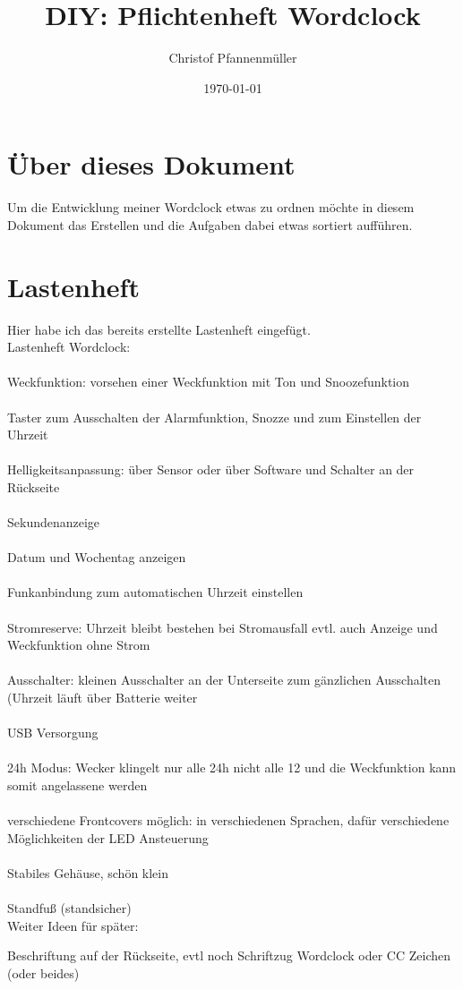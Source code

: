 \documentclass[11pt,a4paper,ngerman]{article}
\date{\today}
\author{Christof Pfannenmüller}
\title{DIY: Pflichtenheft Wordclock}
\begin{document}
\maketitle 
\tableofcontents 
\newpage
\section{Über dieses Dokument}
Um die Entwicklung meiner Wordclock etwas zu ordnen möchte in diesem Dokument das Erstellen und die Aufgaben dabei etwas sortiert aufführen.
\section{Lastenheft}
{\large Hier habe ich das bereits erstellte Lastenheft eingefügt.  }\\
Lastenheft Wordclock:\\
\\ 
Weckfunktion: vorsehen einer Weckfunktion mit Ton und Snoozefunktion\\
\\
Taster zum Ausschalten der Alarmfunktion, Snozze und zum Einstellen der Uhrzeit\\
\\
Helligkeitsanpassung: über Sensor oder über Software und Schalter an der Rückseite\\
\\
Sekundenanzeige\\
\\
Datum und Wochentag anzeigen\\ 
\\
Funkanbindung zum automatischen Uhrzeit einstellen\\
\\
Stromreserve: Uhrzeit bleibt bestehen bei Stromausfall  evtl. auch Anzeige und Weckfunktion ohne Strom\\ 
\\
Ausschalter: kleinen Ausschalter an der Unterseite zum gänzlichen Ausschalten (Uhrzeit läuft über Batterie weiter\\
\\
USB Versorgung\\
\\
24h Modus: Wecker klingelt nur alle 24h nicht alle 12 und die Weckfunktion kann somit angelassene werden\\
\\
verschiedene Frontcovers möglich: in verschiedenen Sprachen, dafür verschiedene Möglichkeiten der LED Ansteuerung\\
\\
Stabiles Gehäuse, schön klein\\
\\
Standfuß (standsicher)\\
Weiter Ideen für später: \par
Beschriftung auf der Rückseite, evtl  noch Schriftzug Wordclock oder CC Zeichen (oder beides)
\end{document}
